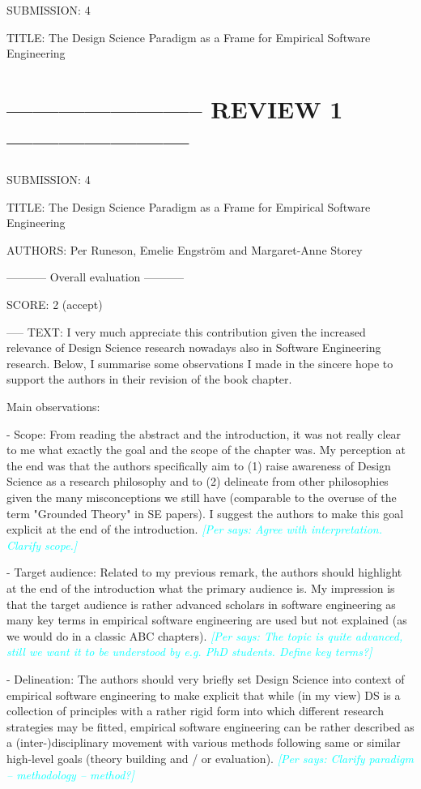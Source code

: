 \documentclass{article}
\newcommand{\per}[1]{\textcolor{cyan}{{\it [Per says: #1]}}}
\newcommand{\per}[1]{}
\begin{document}
SUBMISSION: 4

TITLE: The Design Science Paradigm as a Frame for Empirical Software Engineering


\section*{----------------------- REVIEW 1 ---------------------}

SUBMISSION: 4

TITLE: The Design Science Paradigm as a Frame for Empirical Software Engineering

AUTHORS: Per Runeson, Emelie Engström and Margaret-Anne Storey

----------- Overall evaluation -----------

SCORE: 2 (accept)

----- TEXT:
I very much appreciate this contribution given the increased relevance of Design Science research nowadays also in Software Engineering research. Below, I summarise some observations I made in the sincere hope to support the authors in their revision of the book chapter.

Main observations:

- Scope: From reading the abstract and the introduction, it was not really clear to me what exactly the goal and the scope of the chapter was. My perception at the end was that the authors specifically aim to (1) raise awareness of Design Science as a research philosophy and to (2) delineate from other philosophies given the many misconceptions we still have (comparable to the overuse of the term "Grounded Theory" in SE papers). I suggest the authors to make this goal explicit at the end of the introduction.
\per{Agree with interpretation. Clarify scope.}

- Target audience: Related to my previous remark, the authors should highlight at the end of the introduction what the primary audience is. My impression is that the target audience is rather advanced scholars in software engineering as many key terms in empirical software engineering are used but not explained (as we would do in a classic ABC chapters).
\per{The topic is quite advanced, still we want it to be understood by e.g. PhD students. Define key terms?}

- Delineation: The authors should very briefly set Design Science into context of empirical software engineering to make explicit that while (in my view) DS is a collection of principles with a rather rigid form into which different research strategies may be fitted, empirical software engineering can be rather described as a (inter-)disciplinary movement with various methods following same or similar high-level goals (theory building and / or evaluation). \per{Clarify paradigm -- methodology -- method?}
\end{document}
